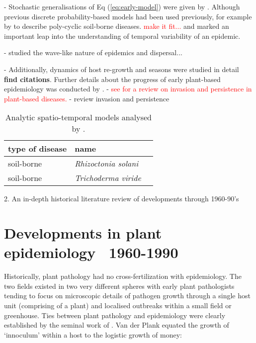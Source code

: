     - Stochastic generalisations of Eq (\ref{eq:early-model}) were given by \cite{doi:10.1098/rspb.1999.0841}. Although previous discrete probability-based models had been used previously, for example by \cite{pub.1034311339} to describe poly-cyclic soil-borne diseases. \textcolor{red}{make it fit...} and marked an important leap into the understanding of temporal variability of an epidemic.
    
    -\cite{ferrandino1993dispersive} studied the wave-like nature of epidemics and dispersal...
    
    - Additionally, dynamics of host re-growth and seasons were studied in detail \textbf{find citations}. Further details about the progress of early plant-based epidemiology was conducted by \cite{Gilligan-disease-management}.
    - \textcolor{red}{see\cite{doi:10.1146/annurev.phyto.45.062806.094357} for a review on invasion and persistence in plant-based diseases.} 
    - review invasion and persistence 
    \vspace{1em}
    \begin{table}[h]
    \centering
    \begin{tabular}{l l l}
    \hline
    \textbf{type of disease} & \textbf{name} \\
    \hline
    soil-borne  & \textit{Rhizoctonia solani} \\ 
    soil-borne & \textit{Trichoderma viride}
    \hline
    \end{tabular}
    \caption{Analytic spatio-temporal models analysed by \cite{jeger1983analysing}.}
    \label{table:1}
    \end{table}


2. An in-depth historical literature review of developments through 1960-90's
    

    \section{Developments in plant epidemiology ~1960-1990}
    Historically, plant pathology had no cross-fertilization with epidemiology. The two fields existed in two very different spheres with early plant pathologists tending to focus on microscopic details of pathogen growth through a single host unit (comprising of a plant) and localised outbreaks within a small field or greenhouse. Ties between plant pathology and epidemiology were clearly established by the seminal work of \cite{van2013plant}. Van der Plank equated the growth of `innoculum' within a host to the logistic growth of money:
    \begin{equation}
        \label{van-plank}
    \end{equation}
    
